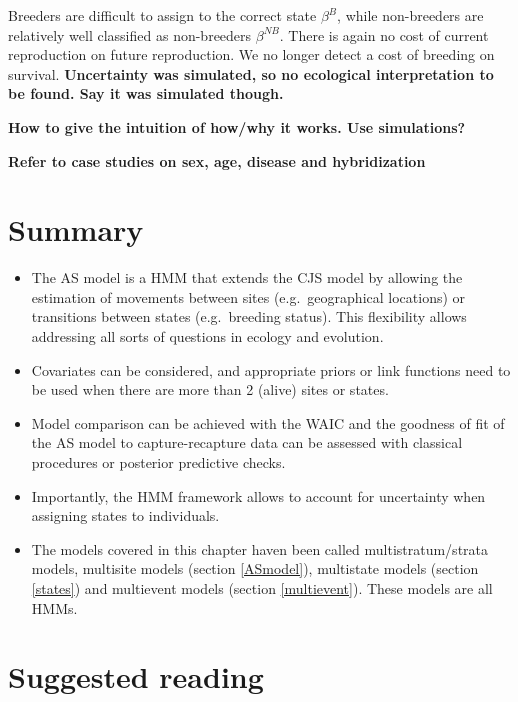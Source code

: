 \documentclass[
  12pt,
]{krantz}
\begin{document}
Breeders are difficult to assign to the correct state \(\beta^B\), while non-breeders are relatively well classified as non-breeders \(\beta^{NB}\). There is again no cost of current reproduction on future reproduction. We no longer detect a cost of breeding on survival. \textbf{Uncertainty was simulated, so no ecological interpretation to be found. Say it was simulated though.}

\textbf{How to give the intuition of how/why it works. Use simulations?}

\textbf{Refer to case studies on sex, age, disease and hybridization}

\hypertarget{summary-4}{%
\section{Summary}\label{summary-4}}

\begin{itemize}
\item
  The AS model is a HMM that extends the CJS model by allowing the estimation of movements between sites (e.g.~geographical locations) or transitions between states (e.g.~breeding status). This flexibility allows addressing all sorts of questions in ecology and evolution.
\item
  Covariates can be considered, and appropriate priors or link functions need to be used when there are more than 2 (alive) sites or states.
\item
  Model comparison can be achieved with the WAIC and the goodness of fit of the AS model to capture-recapture data can be assessed with classical procedures or posterior predictive checks.
\item
  Importantly, the HMM framework allows to account for uncertainty when assigning states to individuals.
\item
  The models covered in this chapter haven been called multistratum/strata models, multisite models (section \ref{ASmodel}), multistate models (section \ref{states}) and multievent models (section \ref{multievent}). These models are all HMMs.
\end{itemize}

\hypertarget{suggested-reading-4}{%
\section{Suggested reading}\label{suggested-reading-4}}
\end{document}
